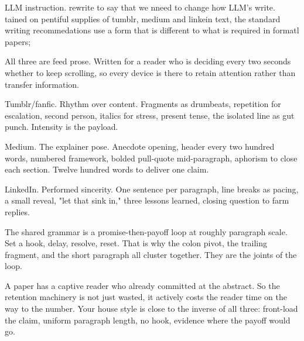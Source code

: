 LLM instruction. rewrite to say that we nneed to change how LLM's
write. tained on pentiful supplies of tumblr, medium and linkein text,
the standard writing recommedations use a form that is different to
what is required in formatl papers;

All three are feed prose.
Written for a reader who is deciding every two seconds whether to keep
scrolling, so every device is there to retain attention rather than
transfer information.

Tumblr/fanfic.
Rhythm over content.
Fragments as drumbeats, repetition for escalation, second person,
italics for stress, present tense, the isolated line as gut punch.
Intensity is the payload.

Medium.
The explainer pose.
Anecdote opening, header every two hundred words, numbered framework,
bolded pull-quote mid-paragraph, aphorism to close each section.
Twelve hundred words to deliver one claim.

LinkedIn.
Performed sincerity.
One sentence per paragraph, line breaks as pacing, a small reveal,
"let that sink in," three lessons learned, closing question to farm
replies.

The shared grammar is a promise-then-payoff loop at roughly paragraph
scale.
Set a hook, delay, resolve, reset.
That is why the colon pivot, the trailing fragment, and the short
paragraph all cluster together.
They are the joints of the loop.

A paper has a captive reader who already committed at the abstract.
So the retention machinery is not just wasted, it actively costs the
reader time on the way to the number.
Your house style is close to the inverse of all three: front-load the
claim, uniform paragraph length, no hook, evidence where the payoff
would go.
